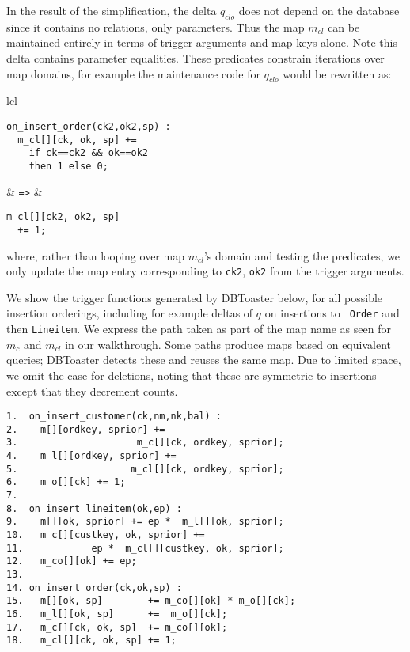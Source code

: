 \vspace{1mm}
In the result of the simplification, the delta $q_{clo}$ does not depend on the
database since it contains no relations, only parameters. Thus the map $m_{cl}$
can be maintained entirely in terms of trigger arguments and map keys alone.
Note this delta contains parameter equalities. These predicates constrain
iterations over map domains, for example the maintenance code for $q_{clo}$
would be rewritten as:

\vspace{1mm}
\begin{tabular}{lcl}
\hspace{-6mm}
\begin{minipage}{1.65in}
{\footnotesize
\begin{verbatim}
on_insert_order(ck2,ok2,sp) :
  m_cl[][ck, ok, sp] +=
    if ck==ck2 && ok==ok2
    then 1 else 0;
\end{verbatim}
}
\end{minipage}
&
{\tt =>}
&
\hspace{-3.5mm}
\begin{minipage}{1.6in}
{\footnotesize
\begin{verbatim}
m_cl[][ck2, ok2, sp]
  += 1;
\end{verbatim}
}
\end{minipage}
\end{tabular}

\vspace{1mm}
\noindent where, rather than looping over map $m_{cl}$'s domain and testing the
predicates, we only update the map entry corresponding to {\tt ck2}, {\tt ok2}
from the trigger arguments.

We show the trigger functions generated by DBToaster below, for all possible
insertion orderings, including for example deltas of $q$ on insertions to {\tt
Order} and then {\tt Lineitem}.  We express the path taken as part of the map
name as seen for $m_{c}$ and $m_{cl}$ in our walkthrough. Some paths produce
maps based on equivalent queries; DBToaster detects these and reuses the same
map.  Due to limited space, we omit the case for deletions, noting that these
are symmetric to insertions except that they decrement counts.


{\footnotesize
\begin{verbatim}
1.  on_insert_customer(ck,nm,nk,bal) :
2.    m[][ordkey, sprior] +=
3.                     m_c[][ck, ordkey, sprior];
4.    m_l[][ordkey, sprior] +=
5.                    m_cl[][ck, ordkey, sprior];
6.    m_o[][ck] += 1;
7. 
8.  on_insert_lineitem(ok,ep) :
9.    m[][ok, sprior] += ep *  m_l[][ok, sprior];
10.   m_c[][custkey, ok, sprior] +=
11.            ep *  m_cl[][custkey, ok, sprior];
12.   m_co[][ok] += ep;
13.
14. on_insert_order(ck,ok,sp) :
15.   m[][ok, sp]        += m_co[][ok] * m_o[][ck]; 
16.   m_l[][ok, sp]      +=  m_o[][ck];
17.   m_c[][ck, ok, sp]  += m_co[][ok];
18.   m_cl[][ck, ok, sp] += 1;
\end{verbatim}
}

